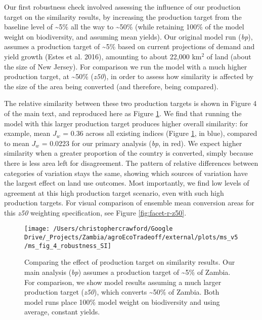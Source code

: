 \documentclass[
]{article}
\begin{document}
Our first robustness check involved assessing the influence of our production target on the similarity results, by increasing the production target from the baseline level of \textasciitilde5\% all the way to \textasciitilde50\% (while retaining 100\% of the model weight on biodiversity, and assuming mean yields). Our original model run (\emph{bp}), assumes a production target of \textasciitilde5\% based on current projections of demand and yield growth (Estes et al. 2016), amounting to about 22,000 km\(^2\) of land (about the size of New Jersey). For comparison we run the model with a much higher production target, at \textasciitilde50\% (\emph{z50}), in order to assess how similarity is affected by the size of the area being converted (and therefore, being compared).

The relative similarity between these two production targets is shown in Figure 4 of the main text, and reproduced here as Figure \ref{fig:z50-bp-comparison}. We find that running the model with this larger production target produces higher overall similarity: for example, mean \(J_w\) = 0.36 across all existing indices (Figure \ref{fig:z50-bp-comparison}, in blue), compared to mean \(J_w\) = 0.0223 for our primary analysis (\emph{bp}, in red). We expect higher similarity when a greater proportion of the country is converted, simply because there is less area left for disagreement. The pattern of relative differences between categories of variation stays the same, showing which sources of variation have the largest effect on land use outcomes. Most importantly, we find low levels of agreement at this high production target scenario, even with such high production targets. For visual comparison of ensemble mean conversion areas for this \emph{z50} weighting specification, see Figure \ref{fig:facet-r-z50}.



\begin{figure}
\texttt{[image: /Users/christophercrawford/Google Drive/\_Projects/Zambia/agroEcoTradeoff/external/plots/ms\_v5/ms\_fig\_4\_robustness\_SI]} \caption{Comparing the effect of production target on similarity results. Our main analysis (\emph{bp}) assumes a production target of \textasciitilde5\% of Zambia. For comparison, we show model results assuming a much larger production target (\emph{z50}), which converts \textasciitilde50\% of Zambia. Both model runs place 100\% model weight on biodiversity and using average, constant yields.}\label{fig:z50-bp-comparison}
\end{figure}
\end{document}
